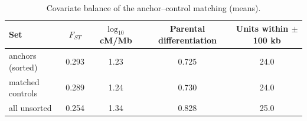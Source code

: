 \begin{table}[htbp]
\centering
\small
\caption{Covariate balance of the anchor--control matching (means).}
\label{tab:balance}
\begin{tabular}{lcccc}
\toprule
Set & $F_{ST}$ & $\log_{10}$ cM/Mb & Parental differentiation & Units within $\pm$100 kb \\
\midrule
anchors (sorted) & 0.293 & 1.23 & 0.725 & 24.0 \\
matched controls & 0.289 & 1.24 & 0.730 & 24.0 \\
all unsorted & 0.254 & 1.34 & 0.828 & 25.0 \\
\bottomrule
\end{tabular}
\end{table}

